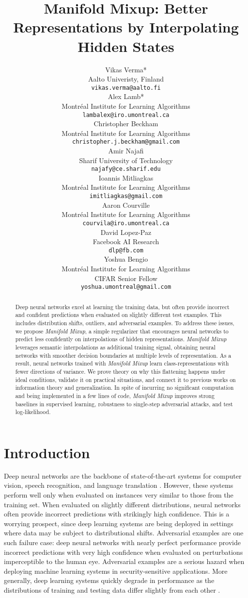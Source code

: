 \documentclass{article} \usepackage[preprint]{nips_2018}
\title{Manifold Mixup: Better Representations by Interpolating Hidden States}
\author{
  Vikas Verma*   \\
  Aalto Univeristy, Finland \hfill\\
  \texttt{vikas.verma@aalto.fi} \\
   \And
   Alex Lamb* \\
   Montr\'{e}al Institute for Learning Algorithms \\
   \texttt{lambalex@iro.umontreal.ca} \\
   \And
   Christopher Beckham \\
   Montr\'{e}al Institute for Learning Algorithms \\
   \texttt{christopher.j.beckham@gmail.com} \\
      \And
   Amir Najafi \hspace{1.4cm} \\
   Sharif University of Technology\hspace{1.4cm}  \\
   \texttt{najafy@ce.sharif.edu}\hspace{1.4cm} \\
   \AND
   Ioannis Mitliagkas \\
   Montr\'{e}al Institute for Learning Algorithms \\
   \texttt{imitliagkas@gmail.com} \\
   \And
   Aaron Courville\hspace{0.8cm} \\
   Montr\'{e}al Institute for Learning Algorithms \\
   \texttt{courvila@iro.umontreal.ca} \\
   \AND
   \hspace{0.8cm}David Lopez-Paz\\
   \hspace{0.8cm}Facebook AI Research\\
   \hspace{0.8cm}\texttt{dlp@fb.com} \\
   \And
   \hspace{0.5cm}Yoshua Bengio \\
   \hspace{0.5cm}Montr\'{e}al Institute for Learning Algorithms \\
   \hspace{0.5cm}CIFAR Senior Fellow \\
   \hspace{0.5cm}\texttt{yoshua.umontreal@gmail.com} \\
}
\newcommand{\manifoldmixup}{\textit{Manifold Mixup}}
\begin{document}
\newtheorem{thm}{Theorem}[section]
\newtheorem{thm2}{Theorem}
\newtheorem{corl}{Corollary}
\newtheorem{note}[thm2]{Note}
\newtheorem{lemma}{Lemma}
\newtheorem{definition}{Definition}
\newtheorem{remark}{Remark}
\newtheorem{claim}{Claim}

\maketitle



\begin{abstract}


Deep neural networks excel at learning the training data, but often provide incorrect and confident predictions when evaluated on slightly different test examples.
This includes distribution shifts, outliers, and adversarial examples.
To address these issues, we propose \manifoldmixup{}, a simple regularizer that encourages neural networks to predict less confidently on interpolations of hidden representations.
\manifoldmixup{} leverages semantic interpolations as additional training signal, obtaining neural networks with smoother decision boundaries at multiple levels of representation. 
As a result, neural networks trained with \manifoldmixup{} learn class-representations with fewer directions of variance.
We prove theory on why this flattening happens under ideal conditions, validate it on practical situations, and connect it to previous works on information theory and generalization.
In spite of incurring no significant computation and being implemented in a few lines of code, \manifoldmixup{} improves strong baselines in supervised learning, robustness to single-step adversarial attacks, and test log-likelihood.
\end{abstract}

\section{Introduction}

Deep neural networks are the backbone of state-of-the-art systems for computer vision, speech recognition, and language translation \citep{lecun2015deep}.  
However, these systems perform well only when evaluated on instances very similar to those from the training set.  
When evaluated on slightly different distributions, neural networks often provide incorrect predictions with strikingly high confidence.
This is a worrying prospect, since deep learning systems are being deployed in settings where data may be subject to distributional shifts. 
Adversarial examples \citep{szegedy2013adv} are one such failure case: deep neural networks with nearly perfect performance provide incorrect predictions with very high confidence when evaluated on perturbations imperceptible to the human eye.
Adversarial examples are a serious hazard when deploying machine learning systems in security-sensitive applications.
More generally, deep learning systems quickly degrade in performance as the distributions of training and testing data differ slightly from each other \citep{ben2010theory}.
\end{document}
